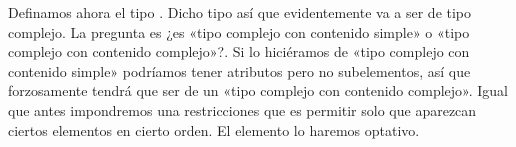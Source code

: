 \documentclass[letterpaper,10pt,spanish]{sphinxmanual}
\begin{document}
\begin{sphinxVerbatim}[commandchars=\\\{\}]
 
      
     
                  
\end{sphinxVerbatim}

Definamos ahora el tipo . Dicho tipo  así que evidentemente va a ser de tipo complejo. La pregunta es ¿es «tipo complejo con contenido simple» o «tipo complejo con contenido complejo»?. Si lo hiciéramos de «tipo complejo con contenido simple» podríamos tener atributos pero no subelementos, así que forzosamente tendrá que ser de un «tipo complejo con contenido complejo». Igual que antes impondremos una restricciones que es permitir solo que aparezcan ciertos elementos en cierto orden. El elemento  lo haremos optativo.
\end{document}

